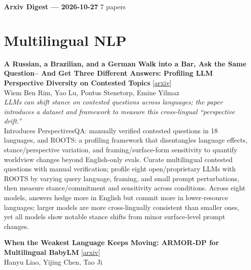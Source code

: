 \documentclass[12pt,letterpaper]{article}
\begin{document}
{\footnotesize\textbf{Arxiv Digest --- 2026-10-27} \hfill 7 papers}

\smallskip

\section*{Multilingual NLP}

{\small\textbf{A Russian, a Brazilian, and a German Walk into a Bar, Ask the Same Question-- And Get Three Different Answers: Profiling LLM Perspective Diversity on Contested Topics}} {\scriptsize[\href{https://arxiv.org/abs/2610.34278}{arxiv}]}\\
{\scriptsize Wiem Ben Rim, Yao Lu, Pontus Stenetorp, Emine Yilmaz}\\

{\small\textit{LLMs can shift stance on contested questions across languages; the paper introduces a dataset and framework to measure this cross-lingual ``perspective drift.''}}\\[1pt]
{\footnotesize Introduces PerspectivesQA: manually verified contested questions in 18 languages, and ROOTS: a profiling framework that disentangles language effects, stance/perspective variation, and framing/surface-form sensitivity to quantify worldview changes beyond English-only evals. Curate multilingual contested questions with manual verification; profile eight open/proprietary LLMs with ROOTS by varying query language, framing, and small prompt perturbations, then measure stance/commitment and sensitivity across conditions. Across eight models, answers hedge more in English but commit more in lower-resource languages; larger models are more cross-lingually consistent than smaller ones, yet all models show notable stance shifts from minor surface-level prompt changes.}

\medskip

{\small\textbf{When the Weakest Language Keeps Moving: ARMOR-DP for Multilingual BabyLM}} {\scriptsize[\href{https://arxiv.org/abs/2610.33583}{arxiv}]}\\
{\scriptsize Hanyu Liao, Yijing Chen, Tao Ji}\\
\end{document}
